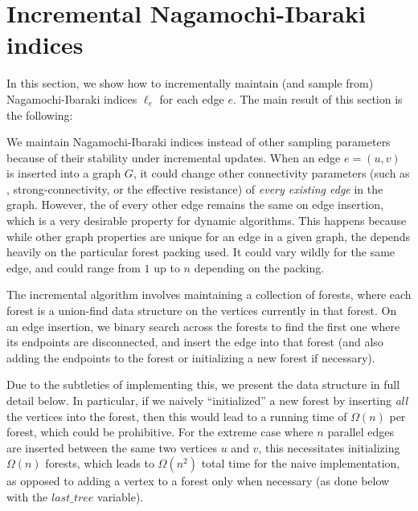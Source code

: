 \documentclass[11pt,a4paper]{article}
\begin{document}
\section{Incremental Nagamochi-Ibaraki indices}
\label{sec:inc_ni}

In this section, we show how to incrementally maintain (and sample from) Nagamochi-Ibaraki indices $\ell_e$ for each edge $e$.
The main result of this section is the following:
\NIsample*

We maintain Nagamochi-Ibaraki indices instead of other sampling parameters because of their stability under incremental updates. When an edge $e = (u,v)$ is inserted into a graph $G$, it could change other connectivity parameters (such as \edgeconnectivity, strong-connectivity, or the effective resistance) of \emph{every existing edge} in the graph. However, the \niindex of every other edge remains the same on edge insertion, which is a very desirable property for dynamic algorithms. This happens because while other graph properties are unique for an edge in a given graph, the \niindex depends heavily on the particular forest packing used. It could vary wildly for the same edge, and could range from $1$ up to $n$ depending on the packing.

The incremental algorithm involves maintaining a collection of forests, where each forest is a union-find data structure on the vertices currently in that forest. On an edge insertion, we binary search across the forests to find the first one where its endpoints are disconnected, and insert the edge into that forest (and also adding the endpoints to the forest or initializing a new forest if necessary).

Due to the subtleties of implementing this, we present the data structure in full detail below. In particular, if we naively ``initialized'' a new forest by inserting \emph{all} the vertices into the forest, then this would lead to a running time of $\Omega(n)$ per forest, which could be prohibitive. For the extreme case where $n$ parallel edges are inserted between the same two vertices $u$ and $v$, this necessitates initializing $\Omega(n)$ forests, which leads to $\Omega(n^2)$ total time for the naive implementation, as opposed to adding a vertex to a forest only when necessary (as done below with the $last\_tree$ variable).
\end{document}
